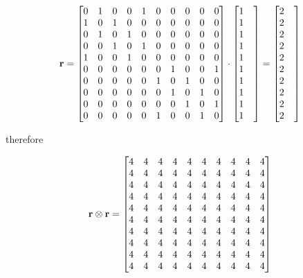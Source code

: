\documentclass[a4paper,12pt]{article}
\begin{document}
	\[ {\bf r} = \begin{bmatrix}
		0& 1& 0& 0& 1& 0& 0& 0& 0& 0\\
		1& 0& 1& 0& 0& 0& 0& 0& 0& 0\\
		0& 1& 0& 1& 0& 0& 0& 0& 0& 0\\
		0& 0& 1& 0& 1& 0& 0& 0& 0& 0\\
		1& 0& 0& 1& 0& 0& 0& 0& 0& 0\\
		0& 0& 0& 0& 0& 0& 1& 0& 0& 1\\
		0& 0& 0& 0& 0& 1& 0& 1& 0& 0\\
		0& 0& 0& 0& 0& 0& 1& 0& 1& 0\\
		0& 0& 0& 0& 0& 0& 0& 1& 0& 1\\
		0& 0& 0& 0& 0& 1& 0& 0& 1& 0
	\end{bmatrix} \cdot \begin{bmatrix}
		1 & \\ 1 & \\ 1 & \\ 1 & \\ 1 & \\ 1 & \\ 1 & \\ 1 & \\ 1 & \\ 1 & \\
	\end{bmatrix} = \begin{bmatrix}
		2 & \\ 2 & \\ 2 & \\ 2 & \\ 2 & \\ 2 & \\ 2 & \\ 2 & \\ 2 & \\ 2 & \\
	\end{bmatrix} \]
	
	therefore
	
	\[ {\bf r}\otimes {\bf r} = \begin{bmatrix}
		4& 4& 4& 4& 4& 4& 4& 4& 4& 4\\
		4& 4& 4& 4& 4& 4& 4& 4& 4& 4\\
		4& 4& 4& 4& 4& 4& 4& 4& 4& 4\\
		4& 4& 4& 4& 4& 4& 4& 4& 4& 4\\
		4& 4& 4& 4& 4& 4& 4& 4& 4& 4\\
		4& 4& 4& 4& 4& 4& 4& 4& 4& 4\\
		4& 4& 4& 4& 4& 4& 4& 4& 4& 4\\
		4& 4& 4& 4& 4& 4& 4& 4& 4& 4\\
		4& 4& 4& 4& 4& 4& 4& 4& 4& 4\\
		4& 4& 4& 4& 4& 4& 4& 4& 4& 4
	\end{bmatrix}\]
	
\end{document}
